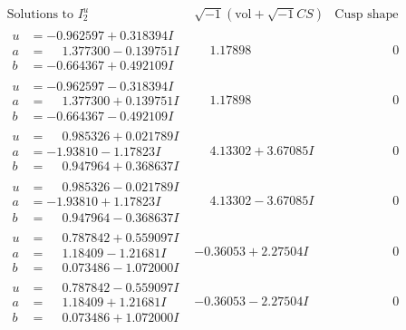 \documentclass[1p]{elsarticle_modified}
\theoremstyle{definition}
\newcommand{\I}{\sqrt{-1}}
\begin{document}
$$\begin{array}{c|c|c}  
\text{Solutions to }I^u_{2}& \I (\text{vol} + \sqrt{-1}CS) & \text{Cusp shape}\\
 \hline 
\begin{aligned}
u &= -0.962597 + 0.318394 I \\
a &= \phantom{-}1.377300 - 0.139751 I \\
b &= -0.664367 + 0.492109 I\end{aligned}
 & \phantom{-}1.17898\phantom{ +0.000000I} & \phantom{-0.000000 } 0 \\ \hline\begin{aligned}
u &= -0.962597 - 0.318394 I \\
a &= \phantom{-}1.377300 + 0.139751 I \\
b &= -0.664367 - 0.492109 I\end{aligned}
 & \phantom{-}1.17898\phantom{ +0.000000I} & \phantom{-0.000000 } 0 \\ \hline\begin{aligned}
u &= \phantom{-}0.985326 + 0.021789 I \\
a &= -1.93810 - 1.17823 I \\
b &= \phantom{-}0.947964 + 0.368637 I\end{aligned}
 & \phantom{-}4.13302 + 3.67085 I & \phantom{-0.000000 } 0 \\ \hline\begin{aligned}
u &= \phantom{-}0.985326 - 0.021789 I \\
a &= -1.93810 + 1.17823 I \\
b &= \phantom{-}0.947964 - 0.368637 I\end{aligned}
 & \phantom{-}4.13302 - 3.67085 I & \phantom{-0.000000 } 0 \\ \hline\begin{aligned}
u &= \phantom{-}0.787842 + 0.559097 I \\
a &= \phantom{-}1.18409 - 1.21681 I \\
b &= \phantom{-}0.073486 - 1.072000 I\end{aligned}
 & -0.36053 + 2.27504 I & \phantom{-0.000000 } 0 \\ \hline\begin{aligned}
u &= \phantom{-}0.787842 - 0.559097 I \\
a &= \phantom{-}1.18409 + 1.21681 I \\
b &= \phantom{-}0.073486 + 1.072000 I\end{aligned}
 & -0.36053 - 2.27504 I & \phantom{-0.000000 } 0 \\ \hline\begin{aligned}

\end{aligned}
\end{array}$$
\end{document}
